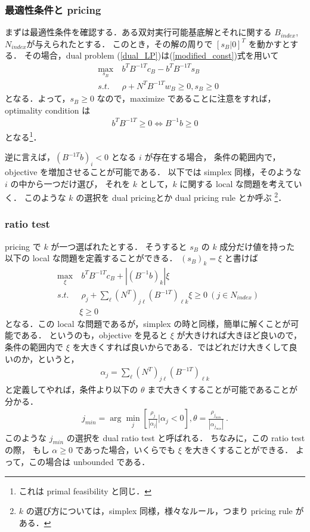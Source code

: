 \documentclass[11pt, a4]{article}
\begin{document}
\subsubsection{最適性条件と pricing}
まずは最適性条件を確認する．ある双対実行可能基底解とそれに関する
$B_{index}$,$N_{index}$が与えられたとする．
このとき，その解の周りで $[s_B|0]^T$ を動かすとする．
その場合，dual problem (\ref{dual_LP})は(\ref{modified_const})式を用いて
\begin{eqnarray}
  &\max_{s_B}&\  b^TB^{-1T}c_B - b^TB^{-1 T} s_B\nonumber\\
  &s.t.&\ \rho + N^TB^{-1 T}w_B \geq 0, s_B\geq 0
\end{eqnarray}
となる．よって，$s_B\geq 0$ なので，maximize であることに注意をすれば，optimality condition は
\begin{eqnarray}
  b^{T}B^{-1 T}\geq 0 \Leftrightarrow B^{-1}b\geq 0
\end{eqnarray}
となる\footnote{これは primal feasibility と同じ．}．

逆に言えば，$(B^{-1 T} b)_i < 0 $ となる $i$ が存在する場合，
条件の範囲内で，objective を増加させることが可能である．
以下では simplex 同様，そのような $i$ の中から一つだけ選び，
それを $k$ として，$k$ に関する local な問題を考えていく．
このような $k$ の選択を dual pricingとか dual pricing rule とか呼ぶ
\footnote{$k$ の選び方については，simplex 同様，様々なルール，つまり pricing rule がある．}．

\subsubsection{ratio test}
pricing で $k$ が一つ選ばれたとする．
そうすると $s_B$ の $k$ 成分だけ値を持った
以下の local な問題を定義することができる．
$(s_B)_k = \xi$ と書けば
\begin{eqnarray}
  &\max_{\xi}&\  b^TB^{-1T}c_B + |(B^{-1}b)_k| \xi\nonumber\\
  &s.t.&\ \rho_j + \sum_{\ell}(N^T)_{j\ell}(B^{-1 T})_{\ell k}\xi \geq 0 \ (j\in N_{index}) \nonumber\\
  &\ &\xi\geq 0
\end{eqnarray}
となる．この local な問題であるが，simplex の時と同様，簡単に解くことが可能である．
というのも，objective を見ると $\xi$ が大きければ大きほど良いので，
条件の範囲内で $\xi$ を大きくすれば良いからである．ではどれだけ大きくして良いのか，というと，
\begin{eqnarray}
  \alpha_j = \sum_{\ell}(N^T)_{j\ell}(B^{-1 T})_{\ell k}
  \label{def_alpha}
\end{eqnarray}
と定義してやれば，条件より以下の $\theta$ まで大きくすることが可能であることが分かる．
\begin{eqnarray}
  j_{min} = \arg \min_j\left[\frac{\rho_j}{|\alpha_j|}|\alpha_j < 0\right], \theta = \frac{\rho_{j_{min}}}{|\alpha_{j_{min}}|}\ .
  \label{i_min}
\end{eqnarray}
このような $j_{min}$ の選択を dual ratio test と呼ばれる．
ちなみに，この ratio test の際，
もし $\alpha \geq 0$ であった場合，いくらでも $\xi$ を大きくすることができる．
よって，この場合は unbounded である．
\end{document}
